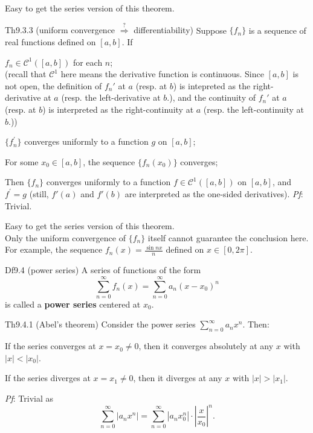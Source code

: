 \documentclass{article}
\begin{document}
\begin{Rmk}{}
    Easy to get the series version of this theorem.
\end{Rmk}

\begin{Th}{Th9.3.3 (uniform convergence $\overset{?}{\Rightarrow}$ differentiability)}
    Suppose $\{f_n\}$ is a sequence of real functions defined on $[a,b]$. If
    \begin{compactenum}
        \item $f_n\in\mathcal{C}^1([a,b])$ for each $n$; \\
        (recall that $\mathcal{C}^1$ here means the derivative function is continuous. Since $[a,b]$ is not open, the definition of $f_n'$ at $a$ (resp. at $b$) is intepreted as the right-derivative at $a$ (resp. the left-derivative at $b$.), and the continuity of $f_n'$ at $a$ (resp. at $b$) is interpreted as the right-continuity at $a$ (resp. the left-continuity at $b$.))
        \item $\{f_n^\prime\}$ converges uniformly to a function $g$ on $[a,b]$;
        \item For some $x_0\in [a,b]$, the sequence $\{f_n(x_0)\}$ converges;
    \end{compactenum}
    Then $\{f_n\}$ converges uniformly to a function $f\in\mathcal{C}^1([a,b])$ on $[a,b]$, and $f^\prime = g$ (still, $f'(a)$ and $f'(b)$ are interpreted as the one-sided derivatives).
    \tcblower
    \textit{Pf}: Trivial.
\end{Th}

\begin{Rmk}{}
    Easy to get the series version of this theorem. \\
    \textcolor{Th}{Only the uniform convergence of $\{f_n\}$ itself cannot guarantee the conclusion here. For example, the sequence $f_n(x) = \frac{\sin nx}{n}$ defined on $x\in [0,2\pi]$.}
\end{Rmk}

\begin{Df}{Df9.4 (power series)}
    A series of functions of the form
    $$ \sum_{n=0}^{\infty} f_n(x) = \sum_{n=0}^{\infty} a_n(x - x_0)^n $$
    is called a \textbf{power series} centered at $x_0$.
\end{Df}

\begin{Th}{Th9.4.1 (Abel's theorem)}    
    Consider the power series $\sum_{n=0}^{\infty} a_n x^n$. Then:
    \begin{compactenum}
        \item If the series converges at $x = x_0\neq 0$, then it converges absolutely at any $x$ with $|x| < |x_0|$.
        \item If the series diverges at $x = x_1\neq 0$, then it diverges at any $x$ with $|x| > |x_1|$.
    \end{compactenum}
    \tcblower
    \textit{Pf}: Trivial as 
    $$ \sum_{n=0}^{\infty} |a_n x^n| = \sum_{n=0}^{\infty} |a_n x_0^n| \cdot \left|\frac{x}{x_0}\right|^n. $$
\end{Th}
\end{document}
